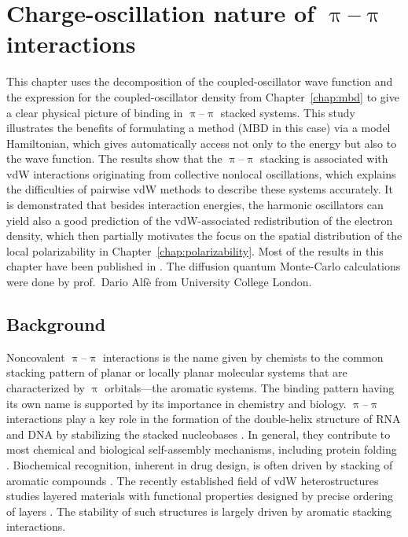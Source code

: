 \chapter{Charge-oscillation nature of $\uppi$--$\uppi$ interactions}\label{chap:pi-pi}

{\sffamily{} This chapter uses the decomposition of the coupled-oscillator wave function and the expression for the coupled-oscillator density from Chapter~\ref{chap:mbd} to give a clear physical picture of binding in $\uppi$--$\uppi$ stacked systems.
This study illustrates the benefits of formulating a method (MBD in this case) via a model Hamiltonian, which gives automatically access not only to the energy but also to the wave function.
The results show that the $\uppi$--$\uppi$ stacking is associated with vdW interactions originating from collective nonlocal oscillations, which explains the difficulties of pairwise vdW methods to describe these systems accurately.
It is demonstrated that besides interaction energies, the harmonic oscillators can yield also a good prediction of the vdW-associated redistribution of the electron density, which then partially motivates the focus on the spatial distribution of the local polarizability in Chapter~\ref{chap:polarizability}.
Most of the results in this chapter have been published in \citep{HermannNC17}.
The diffusion quantum Monte-Carlo calculations were done by prof.\ Dario Alfè from University College London.
}

\section{Background}

Noncovalent $\uppi$--$\uppi$ interactions is the name given by chemists to the common stacking pattern of planar or locally planar molecular systems that are characterized by $\uppi$ orbitals---the aromatic systems.
The binding pattern having its own name is supported by its importance in chemistry and biology.
$\uppi$--$\uppi$ interactions play a key role in the formation of the double-helix structure of RNA and DNA by stabilizing the stacked nucleobases \citep{HunterJMB93}.
In general, they contribute to most chemical and biological self-assembly mechanisms, including protein folding \citep{ArigaSTAM08,ZhangNB03}.
Biochemical recognition, inherent in drug design, is often driven by stacking of aromatic compounds \citep{MeyerACIE03}.
The recently established field of vdW heterostructures studies layered materials with functional properties designed by precise ordering of layers \citep{GeimN13}.
The stability of such structures is largely driven by aromatic stacking interactions.

